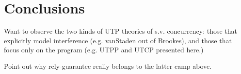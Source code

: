 \section{Conclusions}\label{sec:conc}

Want to observe the two kinds of UTP theories of s.v. concurrency:
those that explicitly model interference (e.g. vanStaden out of Brookes),
and those that focus only on the program (e.g. UTPP and UTCP presented here.)

Point out why rely-guarantee really belongs to the latter camp above.


